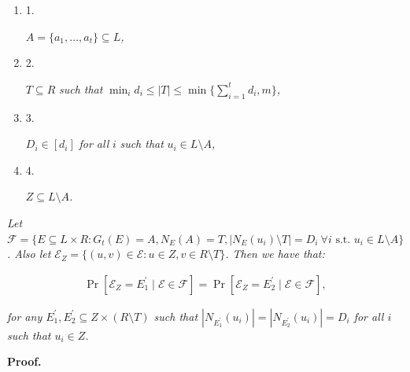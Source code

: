 \documentclass[10pt,a4paper]{article}
\begin{document}
\begin{enumerate}


\item[] 1. 


$A=\{a_{1},\dots,a_{t}\}\subseteq L$\emph{,}\par




\item[] 2. 


$T\subseteq R$\emph{ such that }$\min_{i}{d_{i}}\leq|T|\leq\min\{\sum_{i=1}^{t}d_{i},m\}$\emph{,}\par




\item[] 3. 


$D_{i}\in[d_{i}]$\emph{ for all }$i$\emph{ such that }$u_{i}\in L\setminus A$\emph{,}\par




\item[] 4. 


$Z\subseteq L\setminus A$\emph{.}\par




\end{enumerate}


\emph{Let $\mathscr{F}=\{E\subseteq L\times R:G_{t}(E)=A,N_{E}(A)=T,|N_{E}(u_{i})\setminus T|=D_{i}\ \forall i\text{ s.t. }u_{i}\in L\setminus A\}$.
Also let $\mathcal{E}_{Z}=\{(u,v)\in\mathcal{E}:u\in Z,v\in R\setminus T\}$.
Then we have that:}\par


\[\begin{gathered}
\displaystyle\Pr\left[\mathcal{E}_{Z}=E^{\prime}_{1}\mid\mathcal{E}\in\mathscr{F}\right]=\Pr\left[\mathcal{E}_{Z}=E^{\prime}_{2}\mid\mathcal{E}\in\mathscr{F}\right],
\end{gathered}\]


\emph{for any $E^{\prime}_{1},E^{\prime}_{2}\subseteq Z\times(R\setminus T)$ such that $|N_{E^{\prime}_{1}}(u_{i})|=|N_{E^{\prime}_{2}}(u_{i})|=D_{i}$ for all $i$ such that $u_{i}\in Z$.}\par






\par\medskip\noindent\textbf{Proof.}\par
\end{document}
